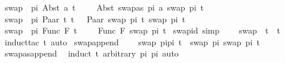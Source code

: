 \begin{isabellebody}
{\isacharbar}{\kern0pt}\ {\isachardoublequoteopen}swap\ \ pi\ {\isacharparenleft}{\kern0pt}Abst\ a\ t{\isacharparenright}{\kern0pt}\ \ \ \ {\isacharequal}{\kern0pt}\ Abst\ {\isacharparenleft}{\kern0pt}swapas\ pi\ a{\isacharparenright}{\kern0pt}\ {\isacharparenleft}{\kern0pt}swap\ pi\ t{\isacharparenright}{\kern0pt}{\isachardoublequoteclose}\isanewline
{\isacharbar}{\kern0pt}\ {\isachardoublequoteopen}swap\ \ pi\ {\isacharparenleft}{\kern0pt}Paar\ t{}\ t{}{\isacharparenright}{\kern0pt}\ \ {\isacharequal}{\kern0pt}\ Paar\ {\isacharparenleft}{\kern0pt}swap\ pi\ t{}{\isacharparenright}{\kern0pt}\ {\isacharparenleft}{\kern0pt}swap\ pi\ t{}{\isacharparenright}{\kern0pt}{\isachardoublequoteclose}\isanewline
{\isacharbar}{\kern0pt}\ {\isachardoublequoteopen}swap\ \ pi\ {\isacharparenleft}{\kern0pt}Func\ F\ t{\isacharparenright}{\kern0pt}\ \ \ \ {\isacharequal}{\kern0pt}\ Func\ F\ {\isacharparenleft}{\kern0pt}swap\ pi\ t{\isacharparenright}{\kern0pt}{\isachardoublequoteclose}\isanewline
\isanewline
{}\isamarkupfalse%
\ swap{\isacharunderscore}{\kern0pt}id\ {\isacharbrackleft}{\kern0pt}simp{\isacharbrackright}{\kern0pt}{\isacharcolon}{\kern0pt}\ \isanewline
\ \ \ {\isachardoublequoteopen}swap\ {\isacharbrackleft}{\kern0pt}{\isacharbrackright}{\kern0pt}\ t\ {\isacharequal}{\kern0pt}\ t{\isachardoublequoteclose}\isanewline
%
\isadelimproof
\ \ %
\endisadelimproof
%
\isatagproof
{}\isamarkupfalse%
\ {\isacharparenleft}{\kern0pt}induct{\isacharunderscore}{\kern0pt}tac\ t{\isacharparenright}{\kern0pt}\ {\isacharparenleft}{\kern0pt}auto{\isacharparenright}{\kern0pt}%
\endisatagproof
{\isafoldproof}%
%
\isadelimproof
\isanewline
%
\endisadelimproof
\isanewline
{}\isamarkupfalse%
\ swap{\isacharunderscore}{\kern0pt}append{\isacharcolon}{\kern0pt}\ \isanewline
\ \ \ {\isachardoublequoteopen}swap\ {\isacharparenleft}{\kern0pt}pi{}{\isacharat}{\kern0pt}pi{}{\isacharparenright}{\kern0pt}\ t\ {\isacharequal}{\kern0pt}\ swap\ pi{}\ {\isacharparenleft}{\kern0pt}swap\ pi{}\ t{\isacharparenright}{\kern0pt}{\isachardoublequoteclose}\isanewline
%
\isadelimproof
\ \ %
\endisadelimproof
%
\isatagproof
{}\isamarkupfalse%
\ swapas{\isacharunderscore}{\kern0pt}append\ \isamarkupfalse%
\ {\isacharparenleft}{\kern0pt}induct\ t\ arbitrary{\isacharcolon}{\kern0pt}\ pi{}\ pi{}{\isacharparenright}{\kern0pt}\ auto%
\endisatagproof
{\isafoldproof}%

\end{isabellebody}
